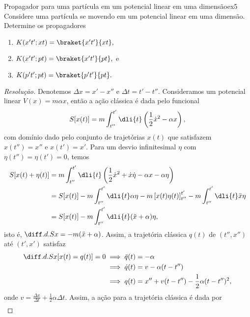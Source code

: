 \begin{exercício}{Propagador para uma partícula em um potencial linear em uma dimensão}{ex5}
   Considere uma partícula se movendo em um potencial linear em uma dimensão. Determine os propagadores 
   \begin{enumerate}[label=(\alph*)]
       \item \(K(x't'; xt) = \braket{x't'}{xt},\)
       \item \(K(x't'; pt) = \braket{x't'}{pt},\) e
       \item \(K(p't'; pt) = \braket{p't'}{pt}.\)
   \end{enumerate}
\end{exercício}
\begin{proof}[Resolução]
   Denotemos \(\Delta x = x' - x''\) e \(\Delta t = t' - t''\). Consideramos um potencial linear \(V(x) = m \alpha x\), então a ação clássica é dada pelo funcional
   \begin{equation*}
      S[x(t)] = m \int_{t''}^{t'} \dli{t} \left(\frac12 \dot{x}^2 - \alpha x\right),
   \end{equation*}
   com domínio dado pelo conjunto de trajetórias \(x(t)\) que satisfazem \(x(t'') = x''\) e \(x(t') = x'.\) Para um desvio infinitesimal \(\eta\) com \(\eta(t'') = \eta (t') = 0\), temos
   \begin{align*}
      S[x(t) + \eta(t)] &= m \int_{t''}^{t'} \dli{t} \left(\frac12 \dot{x}^2 + \dot{x} \dot\eta - \alpha x - \alpha \eta\right)\\
                        &= S[x(t)] - m \int_{t''}^{t'} \dli{t} \alpha \eta - m\left[x(t) \eta(t)\right]_{t''}^{t'} - m \int_{t''}^{t'} \dli{t} \ddot{x} \eta\\
                        &= S[x(t)] - m\int_{t''}^{t'} \dli{t} (\ddot{x}+ \alpha) \eta,
   \end{align*}
   isto é, \(\diff.d.{S}{x} = -m(\ddot{x} + \alpha)\). Assim, a trajetória clássica \(q(t)\) de \((t'', x'')\) até \((t', x')\) satisfaz
   \begin{align*}
      \diff.d.{S}{x}[x(t) = q(t)] = 0 &\implies \ddot{q}(t) = -\alpha\\
                         &\implies \dot{q}(t) = v - \alpha (t - t'')\\
                         &\implies q(t) = x'' + v(t - t'') - \frac12 \alpha (t - t'')^2,
   \end{align*}
   onde \(v = \frac{\Delta x}{\Delta t} + \frac12 \alpha \Delta t\). Assim, a ação para a trajetória clássica é dada por
   \begin{align*}

\end{align*}
\end{proof}
